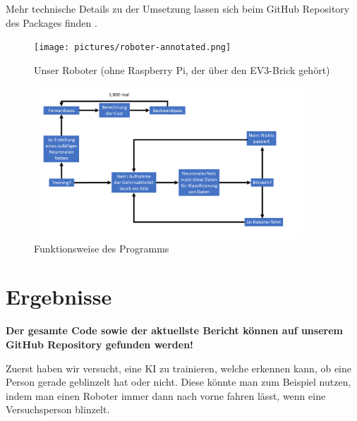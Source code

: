 \documentclass{scrartcl}
\begin{document}
	Mehr technische Details zu der Umsetzung lassen sich beim GitHub Repository des Packages finden \cite{ev3dev}.

	\begin{figure}[H]
		\centering
		\texttt{[image: pictures/roboter-annotated.png]}
		\caption{Unser Roboter (ohne Raspberry Pi, der über den EV3-Brick gehört)}
	\end{figure}


	\begin{figure}[h!]
		\centering
		\includegraphics[width=0.9\textwidth]{pictures/Abbildung-des-Programms.png}
		\caption{Funktionsweise des Programms}
	\end{figure}



	\section{Ergebnisse}

	{\large \textbf{Der gesamte Code sowie der aktuellste Bericht können auf unserem GitHub Repository gefunden werden! \cite{InterpretingEEG}} }

	Zuerst haben wir versucht, eine KI zu trainieren, welche erkennen kann, ob eine Person gerade geblinzelt hat oder nicht. Diese könnte man zum Beispiel nutzen, indem man einen Roboter immer dann nach vorne fahren lässt, wenn eine Versuchsperson blinzelt.
\end{document}

